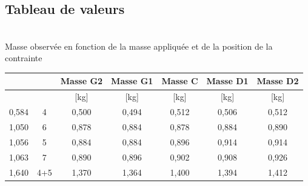 \documentclass[10pt,a4paper]{report}
\begin{document}
\subsection{Tableau de valeurs}
\begin{center}
~\\
Masse observée en fonction de la masse appliquée et de la position de la contrainte
\begin{tabular}{|c|c|c|c|c|c|c|}
\hline
\rowcolor[HTML]{036400} 
\cellcolor[HTML]{963400}{\color[HTML]{FFFFFF} N}        & \cellcolor[HTML]{963400}{\color[HTML]{FFFFFF} N} & {\color[HTML]{FFFFFF} Masse G2} & {\color[HTML]{FFFFFF} Masse G1} & {\color[HTML]{FFFFFF} Masse C}  & {\color[HTML]{FFFFFF} Masse D1} & {\color[HTML]{FFFFFF} Masse D2} \\ \hline
\rowcolor[HTML]{E7F7E7} 
\cellcolor[HTML]{FFECE2}{\color[HTML]{963400} {[}kg{]}} & \cellcolor[HTML]{FFECE2}{\color[HTML]{963400} }  & {\color[HTML]{036400} {[}kg{]}} & {\color[HTML]{036400} {[}kg{]}} & {\color[HTML]{036400} {[}kg{]}} & {\color[HTML]{036400} {[}kg{]}} & {\color[HTML]{036400} {[}kg{]}} \\ \hline
{\color[HTML]{963400} 0,584}                            & {\color[HTML]{963400} 4}                         & {\color[HTML]{036400} 0,500}    & {\color[HTML]{036400} 0,494}    & {\color[HTML]{036400} 0,512}    & {\color[HTML]{036400} 0,506}    & {\color[HTML]{036400} 0,512}    \\ \hline
{\color[HTML]{963400} 1,050}                            & {\color[HTML]{963400} 6}                         & {\color[HTML]{036400} 0,878}    & {\color[HTML]{036400} 0,884}    & {\color[HTML]{036400} 0,878}    & {\color[HTML]{036400} 0,884}    & {\color[HTML]{036400} 0,890}    \\ \hline
{\color[HTML]{963400} 1,056}                            & {\color[HTML]{963400} 5}                         & {\color[HTML]{036400} 0,884}    & {\color[HTML]{036400} 0,884}    & {\color[HTML]{036400} 0,896}    & {\color[HTML]{036400} 0,914}    & {\color[HTML]{036400} 0,914}    \\ \hline
{\color[HTML]{963400} 1,063}                            & {\color[HTML]{963400} 7}                         & {\color[HTML]{036400} 0,890}    & {\color[HTML]{036400} 0,896}    & {\color[HTML]{036400} 0,902}    & {\color[HTML]{036400} 0,908}    & {\color[HTML]{036400} 0,926}    \\ \hline
{\color[HTML]{963400} 1,640}                            & {\color[HTML]{963400} 4+5}                       & {\color[HTML]{036400} 1,370}    & {\color[HTML]{036400} 1,364}    & {\color[HTML]{036400} 1,400}    & {\color[HTML]{036400} 1,394}    & {\color[HTML]{036400} 1,412}    \\ \hline

\end{tabular}
\end{center}
\end{document}

